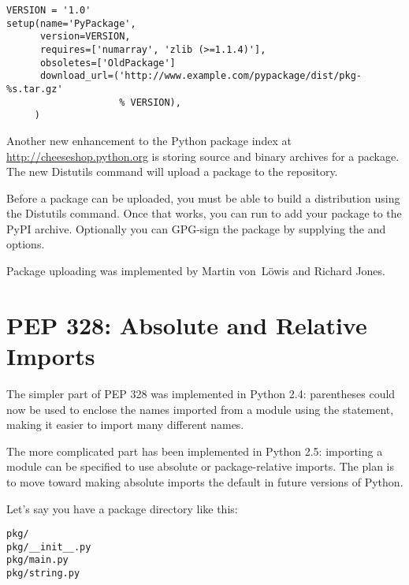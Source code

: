 \documentclass{howto}
\begin{document}
\begin{verbatim}
VERSION = '1.0'
setup(name='PyPackage', 
      version=VERSION,
      requires=['numarray', 'zlib (>=1.1.4)'],
      obsoletes=['OldPackage']
      download_url=('http://www.example.com/pypackage/dist/pkg-%s.tar.gz'
                    % VERSION),
     )
\end{verbatim}

Another new enhancement to the Python package index at
\url{http://cheeseshop.python.org} is storing source and binary
archives for a package.  The new  Distutils command
will upload a package to the repository.

Before a package can be uploaded, you must be able to build a
distribution using the  Distutils command.  Once that
works, you can run  to add your package
to the PyPI archive.  Optionally you can GPG-sign the package by
supplying the  and
 options.

Package uploading was implemented by Martin von~L\"owis and Richard Jones. 
 
\begin{seealso}


\end{seealso}


\section{PEP 328: Absolute and Relative Imports\label{pep-328}}

The simpler part of PEP 328 was implemented in Python 2.4: parentheses
could now be used to enclose the names imported from a module using
the  statement, making it easier to import
many different names.

The more complicated part has been implemented in Python 2.5:
importing a module can be specified to use absolute or
package-relative imports.  The plan is to move toward making absolute
imports the default in future versions of Python.

Let's say you have a package directory like this:
\begin{verbatim}
pkg/
pkg/__init__.py
pkg/main.py
pkg/string.py
\end{verbatim}
\end{document}
